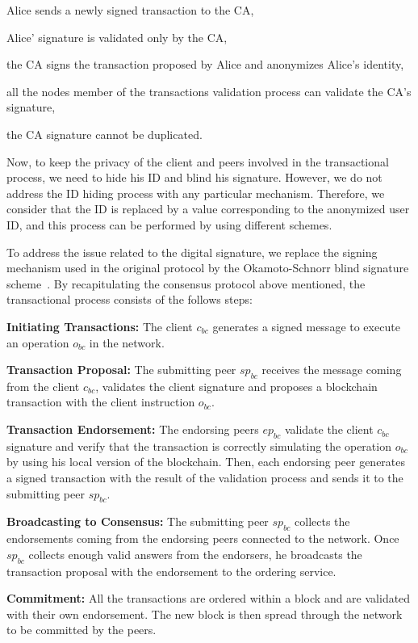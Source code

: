 \documentclass[conference]{llncs}
\begin{document}
\begin{compactitem}
    \item Alice sends a newly signed transaction to the CA,
    \item Alice’ signature is validated only by the CA,
    \item the CA signs the transaction proposed by Alice and anonymizes Alice’s identity,
    \item all the nodes member of the transactions validation process can validate the CA's signature,
    \item the CA signature cannot be duplicated.
\end{compactitem}

Now, to keep the privacy of the client and peers involved in the transactional process, we need to hide his ID and blind his signature. However, we do not address the ID hiding process with any particular mechanism. Therefore, we consider that the ID is replaced by a value corresponding to the anonymized user ID, and this process can be performed by using different schemes.

To address the issue related to the digital signature, we replace the signing mechanism used in the original protocol by the Okamoto-Schnorr blind signature scheme~\cite{okamoto1992provably}. By recapitulating the consensus protocol above mentioned, the transactional process consists of the follows steps:

\begin{compactenum}
    \item \textbf{Initiating Transactions:} The client $c_{bc}$ generates a signed message to execute an operation $o_{bc}$ in the network.
    \item \textbf{Transaction Proposal:} The submitting peer $sp_{bc}$ receives the message coming from the client $c_{bc}$, validates the client signature and proposes a blockchain transaction with the client instruction $o_{bc}$.
    \item \textbf{Transaction Endorsement:} The endorsing peers $ep_{bc}$ validate the client $c_{bc}$ signature and verify that the transaction is correctly simulating the operation $o_{bc}$ by using his local version of the blockchain. Then, each endorsing peer generates a signed transaction with the result of the validation process and sends it to the submitting peer $sp_{bc}$.
    \item \textbf{Broadcasting to Consensus:} The submitting peer $sp_{bc}$ collects the endorsements coming from the endorsing peers connected to the network. Once $sp_{bc}$ collects enough valid answers from the endorsers, he broadcasts the transaction proposal with the endorsement to the ordering service.
    \item \textbf{Commitment:} All the transactions are ordered within a block and are validated with their own endorsement. The new block is then spread through the network to be committed by the peers.
\end{compactenum}
\end{document}

